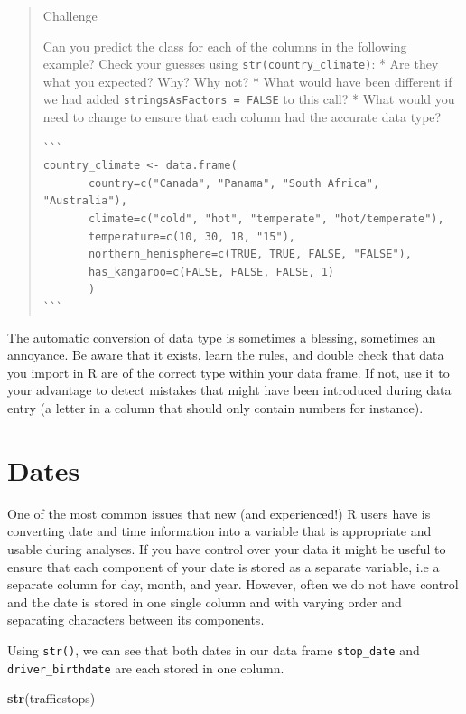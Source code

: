 \documentclass[
]{book}
\newenvironment{Shaded}{\begin{snugshade}}{\end{snugshade}}
\newcommand{\KeywordTok}[1]{\textcolor[rgb]{0.13,0.29,0.53}{\textbf{#1}}}
\newcommand{\NormalTok}[1]{#1}
\begin{document}
\begin{quote}
Challenge

Can you predict the class for each of the columns in the following example?
Check your guesses using \texttt{str(country\_climate)}:
* Are they what you expected? Why? Why not?
* What would have been different if we had added \texttt{stringsAsFactors\ =\ FALSE} to this call?
* What would you need to change to ensure that each column had the accurate data type?

\begin{verbatim}
```
country_climate <- data.frame(
       country=c("Canada", "Panama", "South Africa", "Australia"),
       climate=c("cold", "hot", "temperate", "hot/temperate"),
       temperature=c(10, 30, 18, "15"),
       northern_hemisphere=c(TRUE, TRUE, FALSE, "FALSE"),
       has_kangaroo=c(FALSE, FALSE, FALSE, 1)
       )
```
\end{verbatim}
\end{quote}

The automatic conversion of data type is sometimes a blessing, sometimes an
annoyance. Be aware that it exists, learn the rules, and double check that data
you import in R are of the correct type within your data frame. If not, use it
to your advantage to detect mistakes that might have been introduced during data
entry (a letter in a column that should only contain numbers for instance).

\hypertarget{dates}{%
\section{Dates}\label{dates}}

One of the most common issues that new (and experienced!) R users have is converting
date and time information into a variable that is appropriate and usable during
analyses. If you have control over your data it might be useful to ensure that each component of your date is stored as a separate
variable, i.e a separate column for day, month, and year. However, often we do not have control and the date is stored in one single column and with varying order and separating characters between its components.

Using \texttt{str()}, we can see that both dates in our data frame \texttt{stop\_date} and \texttt{driver\_birthdate} are each stored in one column.

\begin{Shaded}
\begin{Highlighting}[]
\KeywordTok{str}\NormalTok{(trafficstops)}
\end{Highlighting}
\end{Shaded}
\end{document}
